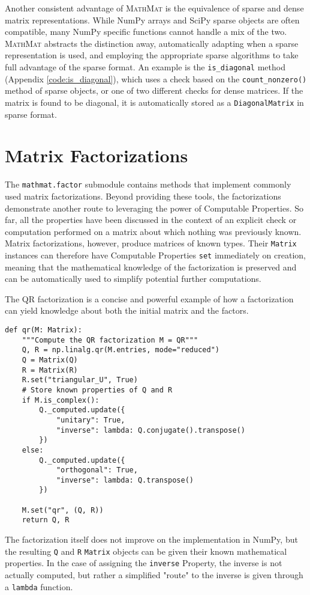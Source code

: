 \documentclass[12pt,a4paper]{article}
\newcommand{\mathmat}{\textsc{MathMat} }
\newcommand{\ct}[1]{\texttt{#1}}
\begin{document}
Another consistent advantage of \mathmat is the equivalence of sparse and dense matrix representations. While NumPy arrays and SciPy sparse objects are often compatible, many NumPy specific functions cannot handle a mix of the two. \mathmat abstracts the distinction away, automatically adapting when a sparse representation is used, and employing the appropriate sparse algorithms to take full advantage of the sparse format. An example is the \ct{is\_diagonal} method (Appendix \ref{code:is_diagonal}), which uses a check based on the \ct{count\_nonzero()} method of sparse objects, or one of two different checks for dense matrices. If the matrix is found to be diagonal, it is automatically stored as a \ct{DiagonalMatrix} in sparse format.

\section{Matrix Factorizations}

The \ct{mathmat.factor} submodule contains methods that implement commonly used matrix factorizations. Beyond providing these tools, the factorizations demonstrate another route to leveraging the power of Computable Properties. So far, all the properties have been discussed in the context of an explicit check or computation performed on a matrix about which nothing was previously known. Matrix factorizations, however, produce matrices of known types. Their \ct{Matrix} instances can therefore have Computable Properties \ct{set} immediately on creation, meaning that the mathematical knowledge of the factorization is preserved and can be automatically used to simplify potential further computations.

The QR factorization is a concise and powerful example of how a factorization can yield knowledge about both the initial matrix and the factors.
\begin{verbatim}
def qr(M: Matrix):
    """Compute the QR factorization M = QR"""
    Q, R = np.linalg.qr(M.entries, mode="reduced")
    Q = Matrix(Q)
    R = Matrix(R)
    R.set("triangular_U", True)
    # Store known properties of Q and R
    if M.is_complex():
        Q._computed.update({
            "unitary": True,
            "inverse": lambda: Q.conjugate().transpose()
        })
    else:
        Q._computed.update({
            "orthogonal": True,
            "inverse": lambda: Q.transpose()
        })

    M.set("qr", (Q, R))
    return Q, R
\end{verbatim}
The factorization itself does not improve on the implementation in NumPy, but the resulting \ct{Q} and \ct{R} \ct{Matrix} objects can be given their known mathematical properties. In the case of assigning the \ct{inverse} Property, the inverse is not actually computed, but rather a simplified "route" to the inverse is given through a \ct{lambda} function. 
\end{document}

